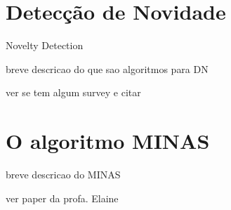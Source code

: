 
\section{Detecção de Novidade}

Novelty Detection

breve descricao do que sao algoritmos para DN

ver se tem algum survey e citar

\section{O algoritmo MINAS}

breve descricao do MINAS \cite{deFaria2016}

ver paper da profa. Elaine

